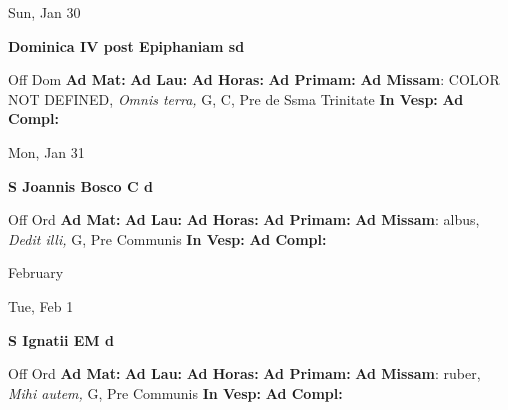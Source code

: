 \documentclass[10pt]{memoir}
\begin{document}
\begin{center}
\begin{minipage}{3.5in}
\vspace{2em}
\begin{center}Sun, Jan 30
\end{center}
\textbf{ \large Dominica IV post Epiphaniam
\textnormal{\normalsize sd}}

\begin{justify}Off Dom
\textbf{Ad Mat: }
\textbf{Ad Lau: }
\textbf{Ad Horas: }
\textbf{Ad Primam: }\textbf{Ad Missam}: COLOR NOT DEFINED, \textit{Omnis terra,} G, C, Pre de Ssma Trinitate
\textbf{In Vesp: }
\textbf{Ad Compl: }
\end{justify}
\end{minipage}
\end{center}

\begin{center}
\begin{minipage}{3.5in}
\vspace{2em}
\begin{center}Mon, Jan 31
\end{center}
\textbf{ \large S Joannis Bosco C
\textnormal{\normalsize d}}

\begin{justify}Off Ord
\textbf{Ad Mat: }
\textbf{Ad Lau: }
\textbf{Ad Horas: }
\textbf{Ad Primam: }\textbf{Ad Missam}: albus, \textit{Dedit illi,} G, Pre Communis
\textbf{In Vesp: }
\textbf{Ad Compl: }
\end{justify}
\end{minipage}
\end{center}

\begin{center}
\pagebreak
\thispagestyle{empty}
{\Huge February}
\end{center}
                    
\begin{center}
\begin{minipage}{3.5in}
\vspace{2em}
\begin{center}Tue, Feb 1
\end{center}
\textbf{ \large S Ignatii EM
\textnormal{\normalsize d}}

\begin{justify}Off Ord
\textbf{Ad Mat: }
\textbf{Ad Lau: }
\textbf{Ad Horas: }
\textbf{Ad Primam: }\textbf{Ad Missam}: ruber, \textit{Mihi autem,} G, Pre Communis
\textbf{In Vesp: }
\textbf{Ad Compl: }
\end{justify}
\end{minipage}
\end{center}
\end{document}
